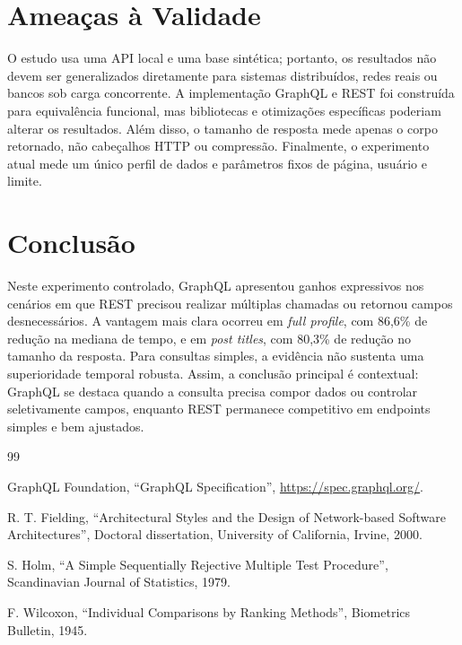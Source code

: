 \documentclass[journal]{IEEEtran}
\begin{document}
\section{Ameaças à Validade}
\label{sec:threats}

O estudo usa uma API local e uma base sintética; portanto, os resultados não devem ser generalizados diretamente para sistemas distribuídos, redes reais ou bancos sob carga concorrente. A implementação GraphQL e REST foi construída para equivalência funcional, mas bibliotecas e otimizações específicas poderiam alterar os resultados. Além disso, o tamanho de resposta mede apenas o corpo retornado, não cabeçalhos HTTP ou compressão. Finalmente, o experimento atual mede um único perfil de dados e parâmetros fixos de página, usuário e limite.

\section{Conclusão}
\label{sec:conclusion}

Neste experimento controlado, GraphQL apresentou ganhos expressivos nos cenários em que REST precisou realizar múltiplas chamadas ou retornou campos desnecessários. A vantagem mais clara ocorreu em \textit{full profile}, com 86,6\% de redução na mediana de tempo, e em \textit{post titles}, com 80,3\% de redução no tamanho da resposta. Para consultas simples, a evidência não sustenta uma superioridade temporal robusta. Assim, a conclusão principal é contextual: GraphQL se destaca quando a consulta precisa compor dados ou controlar seletivamente campos, enquanto REST permanece competitivo em endpoints simples e bem ajustados.

\begin{thebibliography}{99}

 GraphQL Foundation, ``GraphQL Specification'', \url{https://spec.graphql.org/}.

 R. T. Fielding, ``Architectural Styles and the Design of Network-based Software Architectures'', Doctoral dissertation, University of California, Irvine, 2000.

 S. Holm, ``A Simple Sequentially Rejective Multiple Test Procedure'', Scandinavian Journal of Statistics, 1979.

 F. Wilcoxon, ``Individual Comparisons by Ranking Methods'', Biometrics Bulletin, 1945.

\end{thebibliography}
\end{document}
